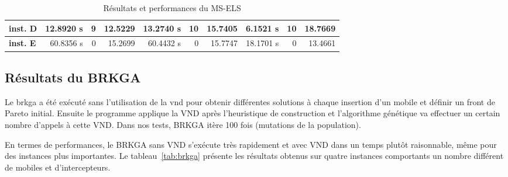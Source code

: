 \begin{table}[H]
\begin{tabular}{l|r|r|r|r|r|r|r|r|r|}
                \multicolumn{1}{|l|}{\textbf{inst. D}} & 12.8920 s                           & 9                                             & 12.5229                                         & 13.2740 s                           & 10                                            & 15.7405                                         & 6.1521 s                            & 10                                            & 18.7669                                         \\ \hline
                \multicolumn{1}{|l|}{\textbf{inst. E}} & 60.8356 s                           & 0                                             & 15.2699                                         & 60.4432 s                           & 0                                             & 15.7747                                         & 18.1701 s                           & 0                                             & 13.4661                                         \\ \hline
                \end{tabular}
                \caption{Résultats et performances du MS-ELS}
                \label{tab:msels}
            \end{table} 

        \subsection{Résultats du BRKGA}
			
			Le \acrlong{brkga} a été exécuté sans l'utilisation de la \acrshort{vnd} pour obtenir différentes solutions à chaque insertion d'un mobile et définir un front de Pareto initial. Ensuite le programme applique la VND après l'heuristique de construction et l'algorithme génétique va effectuer un certain nombre d'appels à cette VND. Dans nos tests, BRKGA itère 100 fois (mutations de la population).
			
			En termes de performances, le BRKGA sans VND s'exécute très rapidement et avec VND dans un temps plutôt raisonnable, même pour des instances plus importantes. Le tableau~\ref{tab:brkga} présente les résultats obtenus sur quatre instances comportants un nombre différent de mobiles et d'intercepteurs.
			
